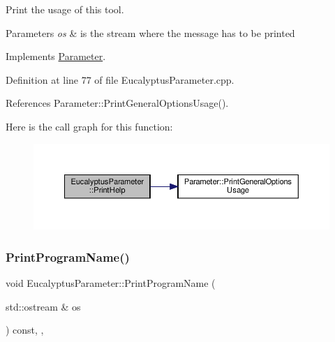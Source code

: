 Print the usage of this tool. 


\begin{DoxyParams}{Parameters}
{\em os} & is the stream where the message has to be printed \\
\hline
\end{DoxyParams}


Implements \hyperlink{classParameter_a804e04bcbc2eca07deed52e112fa3321}{Parameter}.



Definition at line 77 of file Eucalyptus\+Parameter.\+cpp.



References Parameter\+::\+Print\+General\+Options\+Usage().

Here is the call graph for this function\+:
\nopagebreak
\begin{figure}[H]
\begin{center}
\leavevmode
\includegraphics[width=350pt]{d0/d5b/classEucalyptusParameter_a420b6819e64f1d3dcc1be2efeeb91467_cgraph}
\end{center}
\end{figure}
\mbox{\label{classEucalyptusParameter_a028d4f6f94c21b45aa90d90d7328cabf}} 
\subsubsection{\texorpdfstring{Print\+Program\+Name()}{PrintProgramName()}}
{\footnotesize\ttfamily void Eucalyptus\+Parameter\+::\+Print\+Program\+Name (\begin{DoxyParamCaption}\item[{std\+::ostream \&}]{os }\end{DoxyParamCaption}) const\hspace{0.3cm}{\ttfamily [override]}, {\ttfamily [private]}, {\ttfamily [virtual]}}




